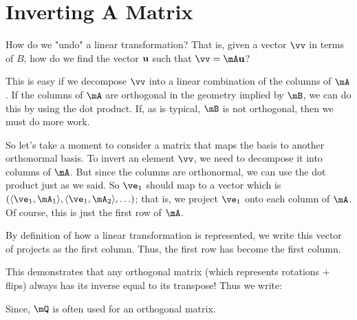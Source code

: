 \section{Inverting A Matrix}

How do we "undo" a linear transformation? That is, given a vector $\vv$
in terms of $B$, how do we find the vector $\bm{\mathrm{u}}$ such that $\vv=\mA\vu$?

This is easy if we decompose $\vv$ into a linear combination of the
columns of $\mA$. If the columns of $\mA$ are orthogonal in the geometry
implied by $\mB$, we can do this by using the dot product. If, as is
typical, $\mB$ is not orthogonal, then we must do more work.

So let's take a moment to consider a matrix that maps the basis to
another orthonormal basis. To invert an element $\vv$, we need to
decompose it into columns of $\mA$. But since the columns are
orthonormal, we can use the dot product just as we said. So $\ve_1$
should map to a vector which is $\parens{\iprod{\ve_1}{\mA_1},
\iprod{\ve_1}{\mA_2}, \ldots}$; that is, we project $\ve_1$ onto each
column of $\mA$. Of course, this is just the first row of $\mA$.

By definition of how a linear transformation is represented, we write
this vector of projects as the first column. Thus, the first row has
become the first column.

This demonstrates that any orthogonal matrix (which represents
rotations + flips) always has its inverse equal to its transpose! Thus
we write:

\begin{nedqn}
  \mQ
\eqcol
  \mQt
\end{nedqn}

Since, $\mQ$ is often used for an orthogonal matrix.
